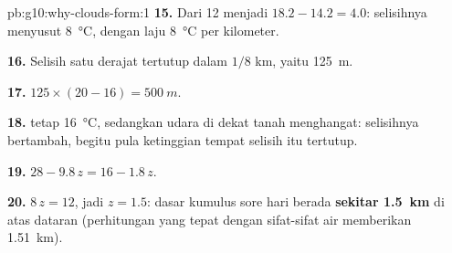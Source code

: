 \begin{solution}{pb:g10:why-clouds-form:1}
\textbf{15.} Dari 12 menjadi $18.2 - 14.2 = 4.0$: selisihnya menyusut
\qty{8}{\degreeCelsius}, dengan laju \qty{8}{\degreeCelsius} per kilometer.

\textbf{16.} Selisih satu derajat tertutup dalam $1/8$ km, yaitu
\qty{125}{m}.

\textbf{17.} $125 \times (20 - 16) = \qty{500}{m}$.

\textbf{18.}  tetap \qty{16}{\degreeCelsius}, sedangkan udara di
dekat tanah menghangat: selisihnya bertambah, begitu pula ketinggian tempat
selisih itu tertutup.

\textbf{19.} $28 - 9.8\,z = 16 - 1.8\,z$.

\textbf{20.} $8\,z = 12$, jadi $z = 1.5$: dasar kumulus sore hari berada
\textbf{sekitar \qty{1.5}{km}} di atas dataran (perhitungan yang tepat dengan
sifat-sifat air memberikan \qty{1.51}{km}).
\end{solution}
